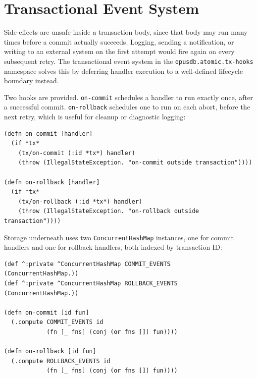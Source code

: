 \section{Transactional Event System}

Side-effects are unsafe inside a transaction body, since that body may run
many times before a commit actually succeeds. Logging, sending a
notification, or writing to an external system on the first attempt would
fire again on every subsequent retry. The transactional event system in the
\texttt{opusdb.atomic.tx-hooks} namespace solves this by deferring handler
execution to a well-defined lifecycle boundary instead.

Two hooks are provided. \texttt{on-commit} schedules a handler to run
exactly once, after a successful commit. \texttt{on-rollback} schedules one
to run on each abort, before the next retry, which is useful for cleanup or
diagnostic logging:

\begin{listing}[H]
  \begin{verbatim}
(defn on-commit [handler]
  (if *tx*
    (tx/on-commit (:id *tx*) handler)
    (throw (IllegalStateException. "on-commit outside transaction"))))

(defn on-rollback [handler]
  (if *tx*
    (tx/on-rollback (:id *tx*) handler)
    (throw (IllegalStateException. "on-rollback outside transaction"))))
\end{verbatim}
  \caption{Hook registration. Handlers are associated with a transaction ID
    and dispatched at the appropriate lifecycle event.}
  \label{lst:hook-registration}
\end{listing}

Storage underneath uses two \texttt{ConcurrentHashMap} instances, one for
commit handlers and one for rollback handlers, both indexed by transaction
ID:

\begin{listing}[H]
  \begin{verbatim}
(def ^:private ^ConcurrentHashMap COMMIT_EVENTS   (ConcurrentHashMap.))
(def ^:private ^ConcurrentHashMap ROLLBACK_EVENTS (ConcurrentHashMap.))

(defn on-commit [id fun]
  (.compute COMMIT_EVENTS id
            (fn [_ fns] (conj (or fns []) fun))))

(defn on-rollback [id fun]
  (.compute ROLLBACK_EVENTS id
            (fn [_ fns] (conj (or fns []) fun))))
\end{verbatim}
  \caption{Core event tables and handler accumulation.}
  \label{lst:event-tables}
\end{listing}

